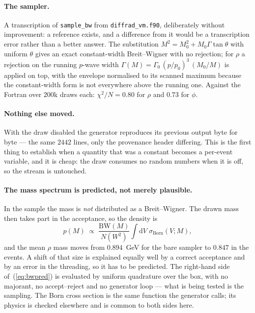 \documentclass[11pt]{article}
\newcommand{\sborn}{\sigma_{\mathrm{Born}}}
\newcommand{\code}[1]{\texttt{#1}}
\begin{document}
\paragraph{The sampler.} A transcription of \code{sample\_bw} from
\code{diffrad\_vm.f90}, deliberately without improvement: a reference exists,
and a difference from it would be a transcription error rather than a better
answer. The substitution $M^2=M_0^2+M_0\Gamma\tan\theta$ with uniform $\theta$
gives an exact constant-width Breit--Wigner with no rejection; for $\rho$ a
rejection on the running $p$-wave width
$\Gamma(M)=\Gamma_0\,(p/p_0)^3\,(M_0/M)$ is applied on top, with the envelope
normalised to its scanned maximum because the constant-width form is not
everywhere above the running one. Against the Fortran over $200$k draws each:
$\chi^2/N=0.80$ for $\rho$ and $0.73$ for $\phi$.

\paragraph{Nothing else moved.} With the draw disabled the generator
reproduces its previous output byte for byte --- the same $2442$ lines, only
the provenance header differing. This is the first thing to establish when a
quantity that was a constant becomes a per-event variable, and it is cheap:
the draw consumes no random numbers when it is off, so the stream is
untouched.

\paragraph{The mass spectrum is predicted, not merely plausible.}
In the sample the mass is \emph{not} distributed as a Breit--Wigner. The
drawn mass then takes part in the acceptance, so the density is
\begin{equation}
p(M)\;\propto\;\frac{\mathrm{BW}(M)}{N(W^2)}
\int\!\mathrm{d}V\;\sborn(V;M),
\label{eq:bwpred}
\end{equation}
and the mean $\rho$ mass moves from $0.894$~GeV for the bare sampler to
$0.847$ in the events. A shift of that size is explained equally well by a
correct acceptance and by an error in the threading, so it has to be
predicted. The right-hand side of~(\ref{eq:bwpred}) is evaluated by uniform
quadrature over the box, with no majorant, no accept--reject and no
generator loop --- what is being tested is the sampling. The Born cross
section is the same function the generator calls; its physics is checked
elsewhere and is common to both sides here.
\end{document}
